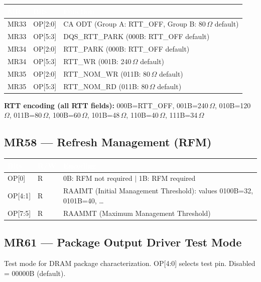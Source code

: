 \documentclass[10pt,a4paper,twoside]{article}
\newcommand{\thd}[1]{\cellcolor{navyblue}\textcolor{white}{\textbf{#1}}}
\newcommand{\trow}{\rowcolor{lightgray}}
\newcommand{\talt}{\rowcolor{skyblue!30}}
\begin{document}
\begin{center}
\begin{tabularx}{\linewidth}{@{} l l X @{}}
\toprule
\thd{MR} & \thd{Bits} & \thd{Function} \\
\midrule
\trow MR33 & OP[2:0] & CA ODT (Group A: RTT\_OFF, Group B: 80\,$\Omega$ default) \\
\talt MR33 & OP[5:3] & DQS\_RTT\_PARK (000B: RTT\_OFF default) \\
\trow MR34 & OP[2:0] & RTT\_PARK (000B: RTT\_OFF default) \\
\talt MR34 & OP[5:3] & RTT\_WR (001B: 240\,$\Omega$ default) \\
\trow MR35 & OP[2:0] & RTT\_NOM\_WR (011B: 80\,$\Omega$ default) \\
\talt MR35 & OP[5:3] & RTT\_NOM\_RD (011B: 80\,$\Omega$ default) \\
\bottomrule
\end{tabularx}
\end{center}

\textbf{RTT encoding (all RTT fields):}
000B=RTT\_OFF, 001B=240\,$\Omega$, 010B=120\,$\Omega$, 011B=80\,$\Omega$,
100B=60\,$\Omega$, 101B=48\,$\Omega$, 110B=40\,$\Omega$, 111B=34\,$\Omega$

\subsection{MR58 --- Refresh Management (RFM)}

\begin{center}
\begin{tabularx}{\linewidth}{@{} l l X @{}}
\toprule
\thd{Bits} & \thd{R/W} & \thd{Encoding} \\
\midrule
\trow OP[0] & R & 0B: RFM not required $|$ 1B: RFM required \\
\talt OP[4:1] & R & RAAIMT (Initial Management Threshold): values 0100B=32, 0101B=40, \ldots \\
\trow OP[7:5] & R & RAAMMT (Maximum Management Threshold) \\
\bottomrule
\end{tabularx}
\end{center}

\subsection{MR61 --- Package Output Driver Test Mode}

Test mode for DRAM package characterization. OP[4:0] selects test pin.
Disabled = 00000B (default).
\end{document}
